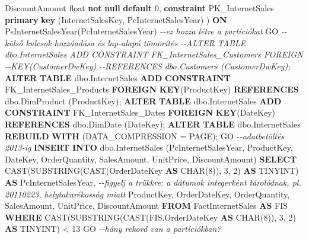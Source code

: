 \documentclass[
  magyar,
]{article}
\newenvironment{Shaded}{}{}
\newcommand{\CommentTok}[1]{\textcolor[rgb]{0.38,0.63,0.69}{\textit{#1}}}
\newcommand{\DataTypeTok}[1]{\textcolor[rgb]{0.56,0.13,0.00}{#1}}
\newcommand{\DecValTok}[1]{\textcolor[rgb]{0.25,0.63,0.44}{#1}}
\newcommand{\FunctionTok}[1]{\textcolor[rgb]{0.02,0.16,0.49}{#1}}
\newcommand{\KeywordTok}[1]{\textcolor[rgb]{0.00,0.44,0.13}{\textbf{#1}}}
\newcommand{\NormalTok}[1]{#1}
\newcommand{\OperatorTok}[1]{\textcolor[rgb]{0.40,0.40,0.40}{#1}}
\begin{document}
\begin{Shaded}
\begin{Highlighting}[]
\NormalTok{   DiscountAmount }\DataTypeTok{float} \KeywordTok{not} \KeywordTok{null} \KeywordTok{default} \DecValTok{0}\NormalTok{,}
   \KeywordTok{constraint}\NormalTok{ PK\_InternetSales }\KeywordTok{primary} \KeywordTok{key}\NormalTok{ (InternetSalesKey, PcInternetSalesYear)}
\NormalTok{)}
\KeywordTok{ON}\NormalTok{ PsInternetSalesYear(PcInternetSalesYear) }\CommentTok{{-}{-}ez hozza létre a partíciókat}
\NormalTok{GO}
\CommentTok{{-}{-}külső kulcsok hozzáadása és lap{-}alapú tömörítés}
\CommentTok{{-}{-}ALTER TABLE dbo.InternetSales ADD CONSTRAINT FK\_InternetSales\_Customers FOREIGN}
\CommentTok{{-}{-}KEY(CustomerDwKey)}
\CommentTok{{-}{-}REFERENCES dbo.Customers (CustomerDwKey);}
\KeywordTok{ALTER} \KeywordTok{TABLE}\NormalTok{ dbo.InternetSales }\KeywordTok{ADD} \KeywordTok{CONSTRAINT}\NormalTok{ FK\_InternetSales\_Products }\KeywordTok{FOREIGN}
\KeywordTok{KEY}\NormalTok{(ProductKey)}
\KeywordTok{REFERENCES}\NormalTok{ dbo.DimProduct (ProductKey);}
\KeywordTok{ALTER} \KeywordTok{TABLE}\NormalTok{ dbo.InternetSales }\KeywordTok{ADD} \KeywordTok{CONSTRAINT}\NormalTok{ FK\_InternetSales\_Dates }\KeywordTok{FOREIGN}
\KeywordTok{KEY}\NormalTok{(DateKey)}
\KeywordTok{REFERENCES}\NormalTok{ dbo.DimDate (DateKey);}
\KeywordTok{ALTER} \KeywordTok{TABLE}\NormalTok{ dbo.InternetSales }\KeywordTok{REBUILD} \KeywordTok{WITH}\NormalTok{ (DATA\_COMPRESSION }\OperatorTok{=}\NormalTok{ PAGE);}
\NormalTok{GO}
\CommentTok{{-}{-}adatbetöltés 2013{-}ig}
\KeywordTok{INSERT} \KeywordTok{INTO}\NormalTok{ dbo.InternetSales (PcInternetSalesYear, ProductKey, DateKey,}
\NormalTok{OrderQuantity, SalesAmount, UnitPrice, DiscountAmount)}
\KeywordTok{SELECT} \FunctionTok{CAST}\NormalTok{(SUBSTRING(}\FunctionTok{CAST}\NormalTok{(OrderDateKey }\KeywordTok{AS} \DataTypeTok{CHAR}\NormalTok{(}\DecValTok{8}\NormalTok{)), }\DecValTok{3}\NormalTok{, }\DecValTok{2}\NormalTok{) }\KeywordTok{AS}\NormalTok{ TINYINT) }\KeywordTok{AS}
\NormalTok{PcInternetSalesYear,}
\CommentTok{{-}{-}figyelj a trükkre: a dátumok integerként tárolódnak, pl. 20110223, helytakarékosság miatt}
\NormalTok{   ProductKey, OrderDateKey, OrderQuantity, SalesAmount, UnitPrice, DiscountAmount}
\KeywordTok{FROM}\NormalTok{ FactInternetSales }\KeywordTok{AS}\NormalTok{ FIS}
\KeywordTok{WHERE} \FunctionTok{CAST}\NormalTok{(SUBSTRING(}\FunctionTok{CAST}\NormalTok{(FIS.OrderDateKey }\KeywordTok{AS} \DataTypeTok{CHAR}\NormalTok{(}\DecValTok{8}\NormalTok{)), }\DecValTok{3}\NormalTok{, }\DecValTok{2}\NormalTok{) }\KeywordTok{AS}\NormalTok{ TINYINT) }\OperatorTok{\textless{}} \DecValTok{13}
\NormalTok{GO}
\CommentTok{{-}{-}hány rekord van a partíciókban?}

\end{Highlighting}
\end{Shaded}
\end{document}
